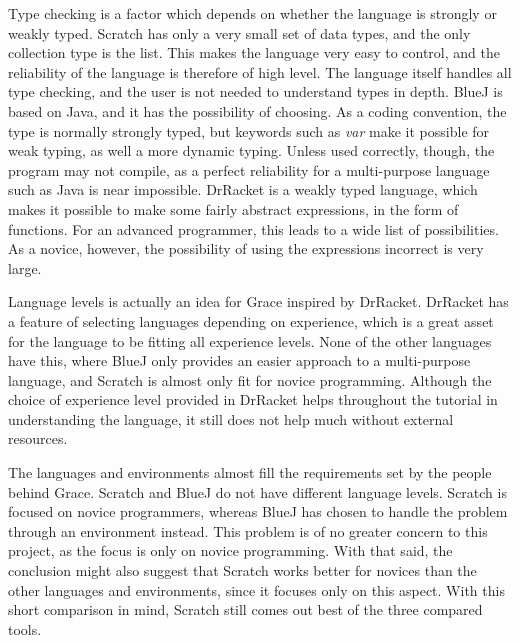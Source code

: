 Type checking is a factor which depends on whether the language is strongly or weakly typed. Scratch has only a very small set of data types, and the only collection type is the list. This makes the language very easy to control, and the reliability of the language is therefore of high level. The language itself handles all type checking, and the user is not needed to understand types in depth. BlueJ is based on Java, and it has the possibility of choosing. As a coding convention, the type is normally strongly typed, but keywords such as \emph{var} make it possible for weak typing, as well a more dynamic typing. Unless used correctly, though, the program may not compile, as a perfect reliability for a multi-purpose language such as Java is near impossible. DrRacket is a weakly typed language, which makes it possible to make some fairly abstract expressions, in the form of functions. For an advanced programmer, this leads to a wide list of possibilities. As a novice, however, the possibility of using the expressions incorrect is very large.

Language levels is actually an idea for Grace inspired by DrRacket\cite{languagesAsLibraries}. DrRacket has a feature of selecting languages depending on experience, which is a great asset for the language to be fitting all experience levels. None of the other languages have this, where BlueJ only provides an easier approach to a multi-purpose language, and Scratch is almost only fit for novice programming. Although the choice of experience level provided in DrRacket helps throughout the tutorial in understanding the language, it still does not help much without external resources.

The languages and environments almost fill the requirements set by the people behind Grace. Scratch and BlueJ do not have different language levels. Scratch is focused on novice programmers, whereas BlueJ has chosen to handle the problem through an environment instead. This problem is of no greater concern to this project, as the focus is only on novice programming. With that said, the conclusion might also suggest that Scratch works better for novices than the other languages and environments, since it focuses only on this aspect. With this short comparison in mind, Scratch still comes out best of the three compared tools.